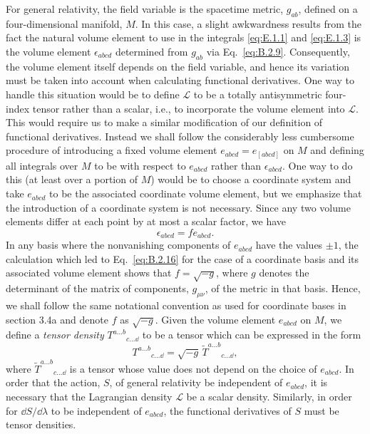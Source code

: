 For general relativity, the field variable is the spacetime metric, \(g_{ab}\),
defined on a four-dimensional manifold, \(M\). In this case, a slight awkwardness
results from the fact the natural volume element to use in the integrals
\eqref{eq:E.1.1} and \eqref{eq:E.1.3} is the volume element \(\epsilon_{abcd}\)
determined from \(g_{ab}\) via Eq.~\eqref{eq:B.2.9}. Consequently, the volume
element itself depends on the field variable, and hence its variation must be taken
into account when calculating functional derivatives. One way to handle this
situation would be to define \(\mathcal L\) to be a totally antisymmetric four-index
tensor rather than a scalar, i.e., to incorporate the volume element into
\(\mathcal L\). This would require us to make a similar modification of our
definition of functional derivatives. Instead we shall follow the considerably less
cumbersome procedure of introducing a fixed volume element
\(e_{abcd}=e_{[abcd]}\) on \(M\) and defining all integrals over \(M\) to be with
respect to \(e_{abcd}\) rather than \(\epsilon_{abcd}\). One way to do this (at
least over a portion of \(M\)) would be to choose a coordinate system and take
\(e_{abcd}\) to be the associated coordinate volume element, but we emphasize that
the introduction of a coordinate system is not necessary. Since any two volume
elements differ at each point by at most a scalar factor, we have
\begin{equation}
  \epsilon_{abcd}=f e_{abcd}.
  \tag{E.1.10}\label{eq:E.1.10}
\end{equation}
In any basis where the nonvanishing components of \(e_{abcd}\) have the values
\(\pm1\), the calculation which led to Eq.~\eqref{eq:B.2.16} for the case of a
coordinate basis and its associated volume element shows that \(f=\sqrt{-g}\),
where \(g\) denotes the determinant of the matrix of components, \(g_{\mu\nu}\), of
the metric in that basis. Hence, we shall follow the same notational convention as
used for coordinate bases in section 3.4a and denote \(f\) as \(\sqrt{-g}\). Given
the volume element \(e_{abcd}\) on \(M\), we define a \emph{tensor density}
\(T^{a\ldots b}{}_{c\ldots \dd}\) to be a tensor which can be expressed in the form
\begin{equation}
  T^{a\ldots b}{}_{c\ldots \dd}
    =\sqrt{-g}\,\widetilde T^{a\ldots b}{}_{c\ldots \dd},
  \tag{E.1.11}\label{eq:E.1.11}
\end{equation}
where \(\widetilde T^{a\ldots b}{}_{c\ldots \dd}\) is a tensor whose value does not
depend on the choice of \(e_{abcd}\). In order that the action, \(S\), of general
relativity be independent of \(e_{abcd}\), it is necessary that the Lagrangian
density \(\mathcal L\) be a scalar density. Similarly, in order for \(\dd S/\dd\lambda\)
to be independent of \(e_{abcd}\), the functional derivatives of \(S\) must be
tensor densities.

